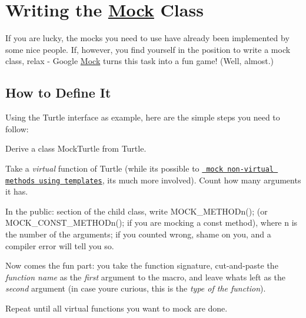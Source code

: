 \section*{Writing the \mbox{\hyperlink{classMock}{Mock}} Class}

If you are lucky, the mocks you need to use have already been implemented by some nice people. If, however, you find yourself in the position to write a mock class, relax -\/ Google \mbox{\hyperlink{classMock}{Mock}} turns this task into a fun game! (Well, almost.)

\subsection*{How to Define It}

Using the {\ttfamily Turtle} interface as example, here are the simple steps you need to follow\+:


\begin{DoxyEnumerate}
\item Derive a class {\ttfamily Mock\+Turtle} from {\ttfamily Turtle}.
\end{DoxyEnumerate}
\begin{DoxyEnumerate}
\item Take a {\itshape virtual} function of {\ttfamily Turtle} (while it\textquotesingle{}s possible to \href{CookBook.md\#mocking-nonvirtual-methods}{\texttt{ mock non-\/virtual methods using templates}}, it\textquotesingle{}s much more involved). Count how many arguments it has.
\end{DoxyEnumerate}
\begin{DoxyEnumerate}
\item In the {\ttfamily public\+:} section of the child class, write {\ttfamily M\+O\+C\+K\+\_\+\+M\+E\+T\+H\+O\+Dn();} (or {\ttfamily M\+O\+C\+K\+\_\+\+C\+O\+N\+S\+T\+\_\+\+M\+E\+T\+H\+O\+Dn();} if you are mocking a {\ttfamily const} method), where {\ttfamily n} is the number of the arguments; if you counted wrong, shame on you, and a compiler error will tell you so.
\end{DoxyEnumerate}
\begin{DoxyEnumerate}
\item Now comes the fun part\+: you take the function signature, cut-\/and-\/paste the {\itshape function name} as the {\itshape first} argument to the macro, and leave what\textquotesingle{}s left as the {\itshape second} argument (in case you\textquotesingle{}re curious, this is the {\itshape type of the function}).
\end{DoxyEnumerate}
\begin{DoxyEnumerate}
\item Repeat until all virtual functions you want to mock are done.
\end{DoxyEnumerate}

